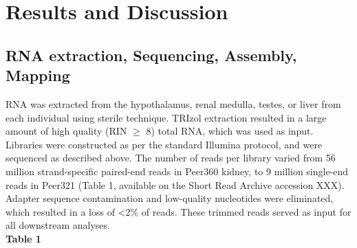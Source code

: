 \documentclass[11pt]{article}
\begin{document}
\section*{Results and Discussion}

\subsection*{RNA extraction, Sequencing, Assembly, Mapping}

RNA was extracted from the hypothalamus, renal medulla, testes, or liver from each individual using sterile technique. TRIzol extraction resulted in a large amount of high quality (RIN $\geq$ 8) total RNA, which was used as input. Libraries were constructed as per the standard Illumina protocol, and were sequenced as described above. The number of reads per library varied from 56 million strand-specific paired-end reads in Peer360 kidney, to 9 million single-end reads in Peer321 (\hypertarget{Table 1}{Table 1}, available on the Short Read Archive accession XXX). Adapter sequence contamination and low-quality nucleotides were eliminated, which resulted in a loss of \textless 2\% of reads. These trimmed reads served as input for all downstream analyses. \\
\textbf{\hypertarget{Table 1}{Table 1}} \\
\end{document}
